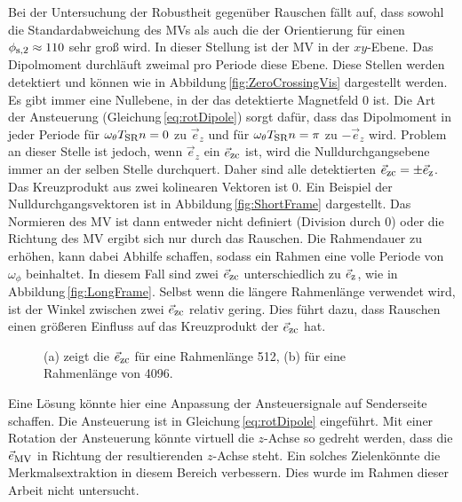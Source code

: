 Bei der Untersuchung der Robustheit gegenüber Rauschen fällt auf, dass sowohl die Standardabweichung des MVs als auch die der Orientierung für einen $\phi_{\textrm{\footnotesize{s,2}}} \approx 110$ sehr groß wird. In dieser Stellung ist der MV in der $xy$-Ebene. Das Dipolmoment durchläuft zweimal pro Periode diese Ebene. Diese Stellen werden detektiert und können wie in Abbildung\,\ref{fig:ZeroCrossingVis} dargestellt werden. Es gibt immer eine Nullebene, in der das detektierte Magnetfeld 0 ist. Die Art der Ansteuerung (Gleichung\,\ref{eq:rotDipole}) sorgt dafür, dass das Dipolmoment in jeder Periode für $\omega_{\theta} T_{\textrm{\footnotesize{SR}}} n = 0$ zu $\vec{e}_{z}$ und für $\omega_{\theta} T_{\textrm{\footnotesize{SR}}} n = \pi$ zu $-\vec{e}_{z}$ wird. Problem an dieser Stelle ist jedoch, wenn $\vec{e}_{z}$ ein $\vec{e}_{\textrm{\footnotesize{zc}}}$ ist, wird die Nulldurchgangsebene immer an der selben Stelle durchquert. Daher sind alle detektierten $\vec{e}_{\textrm{\footnotesize{zc}}}=\pm\vec{e}_{\textrm{\footnotesize{z}}}$. Das Kreuzprodukt aus zwei kolinearen Vektoren ist 0. Ein Beispiel der Nulldurchgangsvektoren ist in Abbildung\,\ref{fig:ShortFrame} dargestellt. Das Normieren des MV ist dann entweder nicht definiert (Division durch 0) oder die Richtung des MV ergibt sich nur durch das Rauschen. Die Rahmendauer zu erhöhen, kann dabei Abhilfe schaffen, sodass ein Rahmen eine volle Periode von $\omega_\phi$ beinhaltet. In diesem Fall sind zwei $\vec{e}_{\textrm{\footnotesize{zc}}}$ unterschiedlich zu $\vec{e}_{\textrm{\footnotesize{z}}}$, wie in Abbildung\,\ref{fig:LongFrame}. Selbst wenn die längere Rahmenlänge verwendet wird, ist der Winkel zwischen zwei $\vec{e}_{\textrm{\footnotesize{zc}}}$ relativ gering. Dies führt dazu, dass Rauschen einen größeren Einfluss auf das Kreuzprodukt der $\vec{e}_{\textrm{\footnotesize{zc}}}$ hat. 


\begin{figure}[h]
  \centering
  \caption{(a) zeigt die $\vec{e}_{\textrm{\footnotesize{zc}}}$ für eine Rahmenlänge 512, (b) für eine Rahmenlänge von 4096.} 
  \label{fig:MerkmalUndefined}
\end{figure}
Eine Lösung könnte hier eine Anpassung der Ansteuersignale auf Senderseite schaffen. Die Ansteuerung ist in Gleichung\,\ref{eq:rotDipole} eingeführt. Mit einer Rotation der Ansteuerung könnte virtuell die $z$-Achse so gedreht werden, dass die $\vec{e}_{\textrm{\footnotesize{MV}}}$ in Richtung der resultierenden $z$-Achse steht. Ein solches \glqq Zielen\grqq  könnte die Merkmalsextraktion in diesem Bereich verbessern. Dies wurde im Rahmen dieser Arbeit nicht untersucht.

